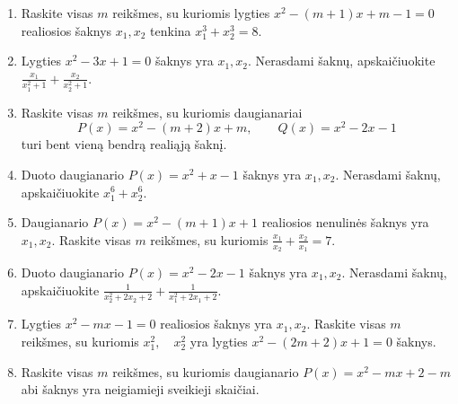 \documentclass[11pt,a4paper]{article}
\begin{document}
\begin{enumerate}
\item \begin{minipage}[t]{\linewidth}Raskite visas \(m\) reikšmes, su kuriomis lygties \(x^{2}-\left(m + 1\right)x+m - 1=0\) realiosios šaknys \(x_1,x_2\) tenkina \mbox{\(x_1^3+x_2^3=8\)}.\end{minipage}
\item \begin{minipage}[t]{\linewidth}Lygties \(x^{2}-3x+1=0\) šaknys yra \(x_1,x_2\). Nerasdami šaknų, apskaičiuokite \mbox{\(\frac{x_{1}}{x_{1}^{2} + 1} + \frac{x_{2}}{x_{2}^{2} + 1}\)}.\end{minipage}
\newpage
\item \begin{minipage}[t]{\linewidth}Raskite visas \(m\) reikšmes, su kuriomis daugianariai \[P(x)=x^{2}-\left(m + 2\right)x+m,\qquad Q(x)=x^{2}-2x-1\] turi bent vieną bendrą realiąją šaknį.\end{minipage}
\item \begin{minipage}[t]{\linewidth}Duoto daugianario \(P(x)=x^{2}+x-1\) šaknys yra \(x_1,x_2\). Nerasdami šaknų, apskaičiuokite \mbox{\(x_{1}^{6} + x_{2}^{6}\)}.\end{minipage}
\item \begin{minipage}[t]{\linewidth}Daugianario \(P(x)=x^{2}-\left(m + 1\right)x+1\) realiosios nenulinės šaknys yra \(x_1,x_2\). Raskite visas \(m\) reikšmes, su kuriomis \mbox{\(\frac{x_1}{x_2}+\frac{x_2}{x_1}=7\)}.\end{minipage}
\item \begin{minipage}[t]{\linewidth}Duoto daugianario \(P(x)=x^{2}-2x-1\) šaknys yra \(x_1,x_2\). Nerasdami šaknų, apskaičiuokite \mbox{\(\frac{1}{x_{2}^{2} + 2 x_{2} + 2} + \frac{1}{x_{1}^{2} + 2 x_{1} + 2}\)}.\end{minipage}
\item \begin{minipage}[t]{\linewidth}Lygties \(x^{2}-mx-1=0\) realiosios šaknys yra \(x_1,x_2\). Raskite visas \(m\) reikšmes, su kuriomis \mbox{\(x_1^2,\quad x_2^2\)} yra lygties \(x^{2}-\left(2 m + 2\right)x+1=0\) šaknys.\end{minipage}
\item \begin{minipage}[t]{\linewidth}Raskite visas \(m\) reikšmes, su kuriomis daugianario \(P(x)=x^{2}-mx+2 - m\) abi šaknys yra neigiamieji sveikieji skaičiai.\end{minipage}

\end{enumerate}
\end{document}
